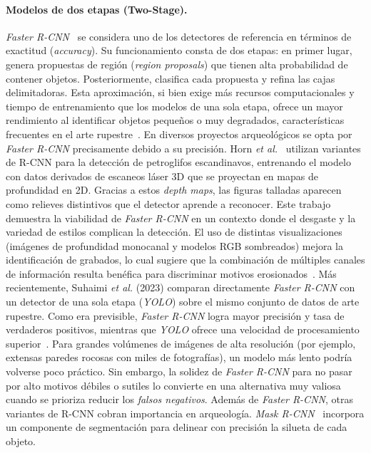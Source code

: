 \paragraph{Modelos de dos etapas (Two-Stage).}
\textit{Faster R-CNN}~\cite{ren2015faster} se considera uno de los detectores de referencia en términos de exactitud (\textit{accuracy}).
Su funcionamiento consta de dos etapas: en primer lugar, genera propuestas de región (\textit{region proposals}) que tienen alta probabilidad de contener objetos. Posteriormente, clasifica cada propuesta y refina las cajas delimitadoras.
Esta aproximación, si bien exige más recursos computacionales y tiempo de entrenamiento que los modelos de una sola etapa, ofrece un mayor rendimiento al identificar objetos pequeños o muy degradados, características frecuentes en el arte rupestre~\cite{suhaimi2023,horn2022ai}.
En diversos proyectos arqueológicos se opta por \textit{Faster R-CNN} precisamente debido a su precisión.
Horn \textit{et al.}~\cite{horn2022} utilizan variantes de R-CNN para la detección de petroglifos escandinavos, entrenando el modelo con datos derivados de escaneos láser 3D que se proyectan en mapas de profundidad en 2D.
Gracias a estos \emph{depth maps}, las figuras talladas aparecen como relieves distintivos que el detector aprende a reconocer.
Este trabajo demuestra la viabilidad de \textit{Faster R-CNN} en un contexto donde el desgaste y la variedad de estilos complican la detección.
El uso de distintas visualizaciones (imágenes de profundidad monocanal y modelos RGB sombreados) mejora la identificación de grabados, lo cual sugiere que la combinación de múltiples canales de información resulta benéfica para discriminar motivos erosionados~\cite{horn2022ai,horn2022}.
Más recientemente, Suhaimi \textit{et al.} (2023) comparan directamente \textit{Faster R-CNN} con un detector de una sola etapa (\textit{YOLO}) sobre el mismo conjunto de datos de arte rupestre.
Como era previsible, \textit{Faster R-CNN} logra mayor precisión y tasa de verdaderos positivos, mientras que \textit{YOLO} ofrece una velocidad de procesamiento superior~\cite{suhaimi2023}.
Para grandes volúmenes de imágenes de alta resolución (por ejemplo, extensas paredes rocosas con miles de fotografías), un modelo más lento podría volverse poco práctico. Sin embargo, la solidez de \textit{Faster R-CNN} para no pasar por alto motivos débiles o sutiles lo convierte en una alternativa muy valiosa cuando se prioriza reducir los \textit{falsos negativos}.
Además de \textit{Faster R-CNN}, otras variantes de R-CNN cobran importancia en arqueología. \textit{Mask R-CNN}~\cite{he2017mask} incorpora un componente de segmentación para delinear con precisión la silueta de cada objeto.
